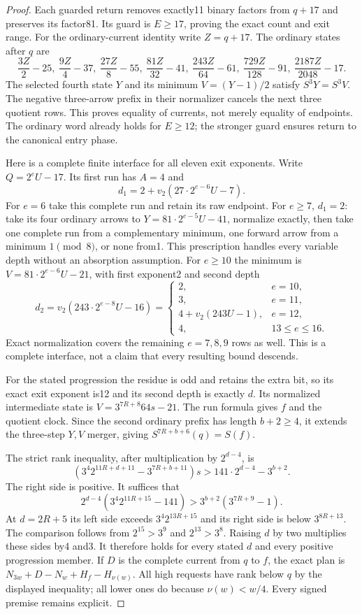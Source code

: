 \documentclass[11pt]{article}
\begin{document}
\begin{proof}
Each guarded return removes exactly11 binary factors from $q+17$ and
preserves its factor81. Its guard is $E\ge17$, proving the exact
count and exit range. For the ordinary-current identity write $Z=q+17$.
The ordinary states after $q$ are
\[
 \frac{3Z}{2}-25,\ \frac{9Z}{4}-37,\ \frac{27Z}{8}-55,
 \ \frac{81Z}{32}-41,\ \frac{243Z}{64}-61,
 \ \frac{729Z}{128}-91,\ \frac{2187Z}{2048}-17.
\]
The selected fourth state $Y$ and its minimum $V=(Y-1)/2$ satisfy
$S^3Y=S^3V$. The negative three-arrow prefix in their normalizer
cancels the next three quotient rows. This proves equality of currents,
not merely equality of endpoints. The ordinary word already holds for
$E\ge12$; the stronger guard ensures return to the canonical entry phase.

Here is a complete finite interface for all eleven exit exponents.
Write $Q=2^eU-17$. Its first run has $A=4$ and
\[
 d_1=2+v_2(27\cdot2^{e-6}U-7).
\]
For $e=6$ take this complete run and retain its raw endpoint.
For $e\ge7$, $d_1=2$: take its four ordinary arrows to
$Y=81\cdot2^{e-5}U-41$, normalize exactly, then take one complete
run from a complementary minimum, one forward arrow from a minimum
$1\pmod8$, or none from1. This prescription handles every variable
depth without an absorption assumption. For $e\ge10$ the minimum is
$V=81\cdot2^{e-6}U-21$, with first exponent2 and second depth
\[
 d_2=v_2(243\cdot2^{e-8}U-16)
 =\begin{cases}2,&e=10,\\3,&e=11,\\
 4+v_2(243U-1),&e=12,\\4,&13\le e\le16.
 \end{cases}
\]
Exact normalization covers the remaining $e=7,8,9$ rows as well.
This is a complete interface, not a claim that every resulting bound descends.

For the stated progression the residue is odd and retains the extra bit,
so its exact exit exponent is12 and its second depth is exactly $d$.
Its normalized intermediate state is $V=3^{7R+8}64s-21$.
The run formula gives $f$ and the quotient clock. Since the second
ordinary prefix has length $b+2\ge4$, it extends the three-step
$Y,V$ merger, giving $S^{7R+b+6}(q)=S(f)$.

The strict rank inequality, after multiplication by $2^{d-4}$, is
\[
 (3^4 2^{11R+d+11}-3^{7R+b+11})s
   >141\cdot2^{d-4}-3^{b+2}.
\]
The right side is positive. It suffices that
\[
 2^{d-4}(3^4 2^{11R+15}-141)
   >3^{b+2}(3^{7R+9}-1).
\]
At $d=2R+5$ its left side exceeds $3^4 2^{13R+15}$ and its right
side is below $3^{8R+13}$. The comparison follows from $2^{15}>3^9$
and $2^{13}>3^8$. Raising $d$ by two multiplies these sides by4 and3.
It therefore holds for every stated $d$ and every positive progression
member. If $D$ is the complete current from $q$ to $f$, the exact plan
is $N_{3w}+D-N_w+H_f-H_{\nu(w)}$. All high requests have rank below
$q$ by the displayed inequality; all lower ones do because
$\nu(w)<w/4$. Every signed premise remains explicit.
\end{proof}
\end{document}
